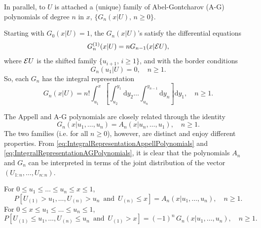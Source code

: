 In parallel, to $U$ is attached a (unique) family of Abel-Gontcharov (A-G) polynomials of degree $n$ in $x$, $\{G_{n}(x\vert U),\, n\geq 0\}$.
\begin{definition} 
Starting with $G_0(x\vert U)=1$, the $G_n(x\vert U)$'s satisfy the differential equations
\begin{equation}\label{eq:DifferentialEquationAGPolynomials}
G_n^{(1)}(x|U)=nG_{n-1}(x|{\cal E}U), 
\end{equation}
where ${\cal E}U$ is the shifted family $\{u_{i+1}, \, i\geq 1\}$, and with the border conditions
\begin{equation}\label{eq:Border AGPolynomial}
G_{n}(u_{1}|U)=0, \quad  n\geq 1.
\end{equation}
So, each $G_n$ has the integral representation
\begin{equation}\label{eq:IntegralRepresentationAGPolynomials}
G_{n}(x|U)=n!\int_{u_{1}}^{x}\left[\int_{u_{2}}^{y_{1}}\text{d}y_{2} \ldots \int_{u_{n}}^{y_{n-1}}\text{d}y_{n}\right]\text{d}y_{1}, \quad n\geq 1.
\end{equation}
\end{definition}
\noindent The Appell and A-G polynomials are closely related through the identity
\begin{equation}\label{eq:link_AG_Appell}
G_{n}(x|u_{1},\ldots,u_{n})=A_{n}(x|u_{n},\ldots,u_{1}), \quad n\geq 1.
\end{equation}
The two families (i.e. for all $n\geq 0$), however, are distinct and enjoy different properties. From \eqref{eq:IntegralRepresentationAppellPolynomials} and \eqref{eq:IntegralRepresentationAGPolynomials}, it is clear that the polynomials $A_n$ and $G_n$ can be interpreted in terms of the joint distribution of the vector $(U_{1:n},\ldots,U_{n:n})$. 
\begin{prop}
For $0\leq u_1 \leq \ldots \leq u_{n} \leq x \leq 1$,
\begin{equation}\label{eq:ProbabilisticInterpretationAppellPolynomials}
P[U_{(1)} > u_1, \ldots, U_{(n)} > u_{n}\, \mbox{ and }\, U_{(n)}\leq x]= 
A_n(x \vert u_1, \ldots, u_{n}), \quad n\geq1.
\end{equation}
For $0\leq x \leq u_1 \leq \ldots \leq u_{n} \leq 1$,
\begin{equation}\label{eq:ProbabilisticInterpretationAGPolynomials}
P[U_{(1)} \leq u_1, \ldots, U_{(n)} \leq u_{n}\, \mbox{ and }\, U_{(1)}> x]
= (-1)^n \, G_n(x \vert u_1, \ldots, u_{n}), \quad n\geq 1.
\end{equation}
\end{prop}
